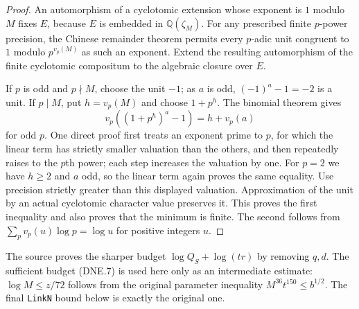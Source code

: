 \begin{proof}
An automorphism of a cyclotomic extension whose exponent is $1$
modulo $M$ fixes $E$, because $E$ is embedded in
$\mathbb Q(\zeta_M)$.  For any prescribed finite $p$-power precision,
the Chinese remainder theorem permits every $p$-adic unit congruent
to $1$ modulo $p^{v_p(M)}$ as such an exponent.  Extend the resulting
automorphism of the finite cyclotomic compositum to the algebraic
closure over $E$.

If $p$ is odd and $p\nmid M$, choose the unit $-1$; as $a$ is odd,
$(-1)^a-1=-2$ is a unit.  If $p\mid M$, put $h=v_p(M)$ and choose
$1+p^h$.  The binomial theorem gives
\[
 v_p((1+p^h)^a-1)=h+v_p(a)
\]
for odd $p$.  One direct proof first treats an exponent prime to
$p$, for which the linear term has strictly smaller valuation than
the others, and then repeatedly raises to the $p$th power; each
step increases the valuation by one.  For $p=2$ we have $h\ge2$
and $a$ odd, so the linear term again proves the same equality.
Use precision strictly greater than this displayed valuation.
Approximation of the unit by an actual cyclotomic character value
preserves it.  This proves the first inequality and also proves
that the minimum is finite.  The second follows from
$\sum_pv_p(u)\log p=\log u$ for positive integers $u$.
\end{proof}

The source proves the sharper budget $\log Q_S+\log(tr)$ by removing
$q,d$.  The sufficient budget (DNE.7) is used here only as an
intermediate estimate: $\log M\le z/72$ follows from the original
parameter inequality $M^{36}t^{150}\le b^{1/2}$.  The final
\texttt{LinkN} bound below is exactly the original one.

